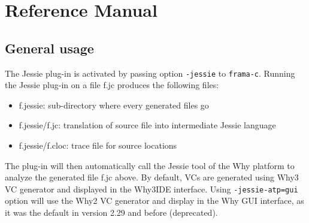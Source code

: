 \documentclass[a4paper,11pt,twoside,openright]{report}
\begin{document}
% 


% 


% 


\chapter{Reference Manual}

\section{General usage}
\label{sec:general}

The Jessie plug-in is activated by passing option
\verb|-jessie| to \verb|frama-c|. Running the Jessie plug-in
on a file f.jc produces the following files:

\begin{itemize}
\item f.jessie: sub-directory where every generated files go
\item f.jessie/f.jc: translation of source file into intermediate Jessie language
\item f.jessie/f.cloc: trace file for source locations
\end{itemize}

The plug-in will then automatically call the Jessie tool of the Why
platform to analyze the generated file f.jc above. By default, VCs are
generated using Why3 VC generator and displayed in the Why3IDE
interface. Using \verb|-jessie-atp=gui| option will use the Why2 VC
generator and display in the Why GUI interface, as it was the default
in version 2.29 and before (deprecated).
\end{document}
